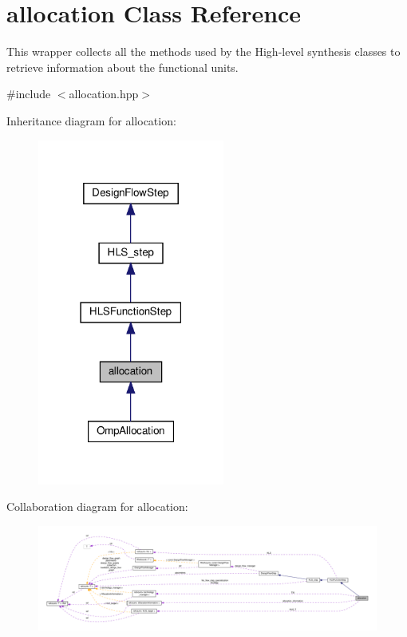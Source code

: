 \hypertarget{classallocation}{}\section{allocation Class Reference}
\label{classallocation}


This wrapper collects all the methods used by the High-\/level synthesis classes to retrieve information about the functional units.  




{\ttfamily \#include $<$allocation.\+hpp$>$}



Inheritance diagram for allocation\+:
\nopagebreak
\begin{figure}[H]
\begin{center}
\leavevmode
\includegraphics[width=174pt]{db/d49/classallocation__inherit__graph}
\end{center}
\end{figure}


Collaboration diagram for allocation\+:
\nopagebreak
\begin{figure}[H]
\begin{center}
\leavevmode
\includegraphics[width=350pt]{d3/d3c/classallocation__coll__graph}
\end{center}
\end{figure}
